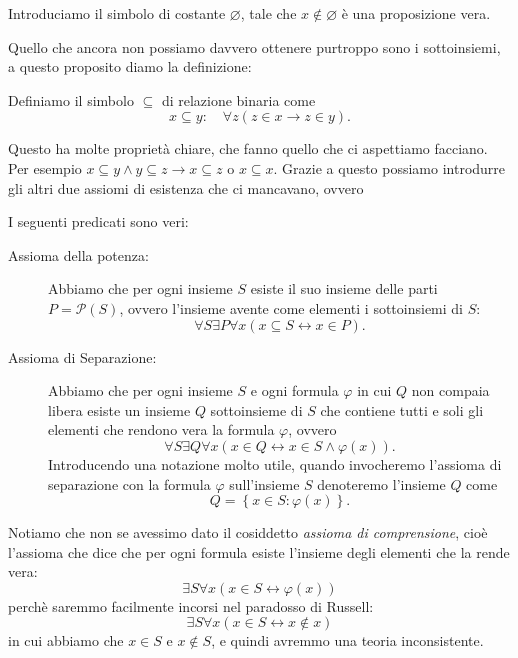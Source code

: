 \documentclass[11pt]{scrartcl}
\newcommand{\eset}{\varnothing}
\newcommand{\parti}[1]{\mathcal{P}\!\left(#1\right)}
\begin{document}
	\begin{definition}
		Introduciamo il simbolo di costante $\eset$, tale che $x\not\in \eset$ è una proposizione vera.
	\end{definition}
	Quello che ancora non possiamo davvero ottenere purtroppo sono i sottoinsiemi, a questo proposito diamo la definizione:
	\begin{definition}[Sottoinsieme]
		Definiamo il simbolo $\subseteq$ di relazione binaria come
		$$x\subseteq y : \quad \forall z \left(z\in x \to z\in y\right).$$
	\end{definition}
	Questo ha molte proprietà chiare, che fanno quello che ci aspettiamo facciano. Per esempio $x\subseteq y \land y\subseteq z\to x\subseteq z$ o $x\subseteq x$. Grazie a questo possiamo introdurre gli altri due assiomi di esistenza che ci mancavano, ovvero
	\begin{definition}
		I seguenti predicati sono veri:
		\begin{description}
			\item[Assioma della potenza:] Abbiamo che per ogni insieme $S$ esiste il suo insieme delle parti $P=\parti{S}$, ovvero l'insieme avente come elementi i sottoinsiemi di $S$:
			$$\forall S\exists P\forall x \left(x\subseteq S \leftrightarrow x\in P\right).$$
			\item[Assioma di Separazione:] Abbiamo che per ogni insieme $S$ e ogni formula $\varphi$ in cui $Q$ non compaia libera esiste un insieme $Q$ sottoinsieme di $S$ che contiene tutti e soli gli elementi che rendono vera la formula $\varphi$, ovvero
			$$\forall S \exists Q \forall x\left(x\in Q \leftrightarrow x\in S \land \varphi(x)\right).$$ 
			Introducendo una notazione molto utile, quando invocheremo l'assioma di separazione con la formula $\varphi$ sull'insieme $S$ denoteremo l'insieme $Q$ come
			$$Q=\left\{x\in S : \varphi(x)\right\}.$$
		\end{description}
	\end{definition}
	\begin{remark}
		Notiamo che non se avessimo dato il cosiddetto \textit{assioma di comprensione}, cioè l'assioma che dice che per ogni formula esiste l'insieme degli elementi che la rende vera:
		$$\exists S\forall x\left(x\in S \leftrightarrow \varphi(x)\right)$$
		perchè saremmo facilmente incorsi nel paradosso di Russell:
		$$\exists S \forall x\left(x\in S \leftrightarrow x\not\in x\right)$$ 
		in cui abbiamo che $x\in S$ e $x\not\in S$, e quindi avremmo una teoria inconsistente.
	\end{remark}
\end{document}
